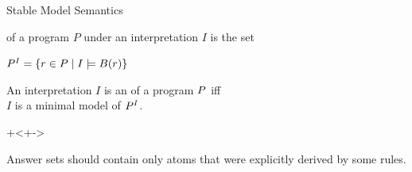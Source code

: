 \documentclass{beamer}
\begin{document}
\begin{frame}{Stable Model Semantics}
	\onslide<+->
	
	\begin{definition}
		 of a program $P$ under an interpretation $I$ is the set
		\begin{center}
			${P}^{I} = \{r \in P \mid I \models B\mathrm{(}{r}\mathrm{)}\}$
		\end{center}
	\end{definition}
	
	\begin{definition}
		An interpretation $I$ is an  of a program $P$ iff\\
		$I$ is a minimal model of ${P}^{I}$.
	\end{definition}
	
	\onslide+<+->
	
	Answer sets should contain only atoms that were explicitly derived by some rules.
	
\end{frame}
\end{document}
